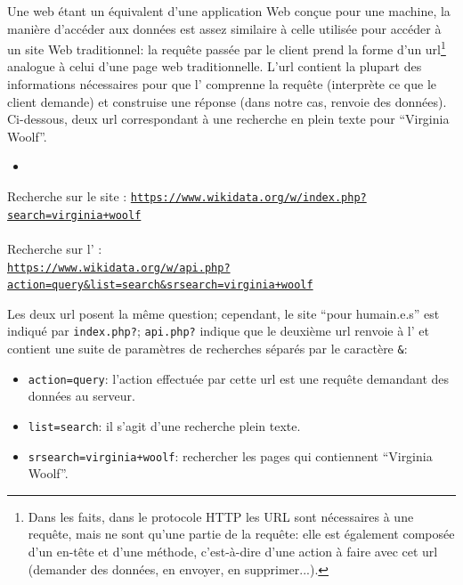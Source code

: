 Une \api{} web étant un équivalent d'une application Web conçue pour une machine, la manière d'accéder aux données est assez similaire à celle utilisée pour accéder à un site Web traditionnel: la requête passée par le client prend la forme d'un \gls{url}\footnote{Dans les faits, dans le protocole HTTP les URL sont nécessaires à une requête, mais ne sont qu'une partie de la requête: elle est également composée d'un en-tête et d'une méthode, c'est-à-dire d'une action à faire avec cet \gls{url} (demander des données, en envoyer, en supprimer...).} analogue à celui d'une page web traditionnelle. L'\gls{url} contient la plupart des informations nécessaires pour que l'\api{} comprenne la requête (interprète ce que le client demande) et construise une réponse (dans notre cas, renvoie des données). Ci-dessous, deux \gls{url} correspondant à une recherche en plein texte pour \enquote{Virginia Woolf}.
\begin{itemize}
	\item 
\end{itemize}

\begin{center}
	Recherche sur le site \wkd{}: \texttt{\url{https://www.wikidata.org/w/index.php?search=virginia+woolf}}
	\\~\\
	Recherche sur l'\api{} \wkd{}:\\ \texttt{\url{https://www.wikidata.org/w/api.php?action=query&list=search&srsearch=virginia+woolf}}
\end{center}

Les deux \gls{url} posent la même question; cependant, le site \enquote{pour humain.e.s} est indiqué par \texttt{index.php?}; \texttt{api.php?} indique que le deuxième \gls{url} renvoie à l'\api{} et contient une suite de paramètres de recherches séparés par le caractère \texttt{\&}:
\begin{itemize}
	\item \texttt{action=query}: l'action effectuée par cette \gls{url} est une requête demandant des données au serveur.
	\item \texttt{list=search}: il s'agit d'une recherche plein texte.
	\item \texttt{srsearch=virginia+woolf}: rechercher les pages qui contiennent \enquote{Virginia Woolf}.
\end{itemize}

